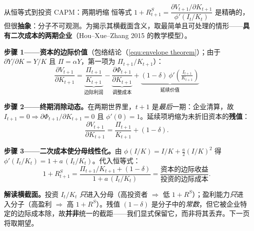 \documentclass{beamer}
\begin{document}
\begin{frame}{从恒等式到投资 CAPM：两期坍缩}
	恒等式 $1+R^S_{t+1}=\dfrac{\partial V_{t+1}/\partial K_{t+1}}{\phi'(I_t/K_t)}$ 是精确的，但很\textbf{抽象}：分子不可观测。为揭示其横截面含义，取最简单且可处理的情形——\textbf{具有二次成本的两期企业}（Hou--Xue--Zhang 2015 的教学模型）。

	\vspace{0.1cm}
	\textbf{步骤 1——资本的边际价值}（包络结论（\ref{equ:envelope theorem}）；由于 $\partial Y/\partial K=Y/K$ 且 $\Pi=\alpha Y$，第一项为 $\Pi_{t+1}/K_{t+1}$）：
	\begin{equation*}
		\frac{\partial V_{t+1}}{\partial K_{t+1}} = \underbrace{\frac{\Pi_{t+1}}{K_{t+1}}}_{\text{边际利润}} - \underbrace{\frac{\partial \Phi_{t+1}}{\partial K_{t+1}}}_{\text{调整成本}} + \underbrace{(1-\delta)\,\phi'\!\left(\tfrac{I_{t+1}}{K_{t+1}}\right)}_{\text{延续价值}}
	\end{equation*}

	\textbf{步骤 2——终期消除动态。}在两期世界里，$t+1$ 是\textit{最后}一期：企业清算，故 $I_{t+1}=0\Rightarrow \partial\Phi_{t+1}/\partial K_{t+1}=0$ 且 $\phi'(0)=1$。延续项坍缩为未折旧资本的\textbf{残值}：
	\begin{equation*}
		\frac{\partial V_{t+1}}{\partial K_{t+1}} = \frac{\Pi_{t+1}}{K_{t+1}} + (1-\delta).
	\end{equation*}

	\textbf{步骤 3——二次成本使分母线性化。}由 $\phi(I/K)=I/K+\tfrac a2(I/K)^2$ 得 $\phi'(I_t/K_t)=1+a\,(I_t/K_t)$。代入恒等式：
	\begin{equation*}
		1+R^S_{t+1}=\frac{\Pi_{t+1}/K_{t+1}+(1-\delta)}{1+a\,(I_t/K_t)}=\frac{\text{资本的边际收益}}{\text{投资的边际成本}}.
	\end{equation*}

	\textbf{解读横截面。}投资 $I_t/K_t$ \textit{只}进入分母（高投资者 $\Rightarrow$ 低 $1+R^S$）；盈利能力\textit{只}进入分子（高盈利 $\Rightarrow$ 高 $1+R^S$）。残值 $(1-\delta)$ 是分子中的\textit{常数}，但它被企业特定的边际成本除，故\textbf{并非}统一的截距——我们显式保留它，而非将其丢弃。下一页将取期望。
\end{frame}
\end{document}
